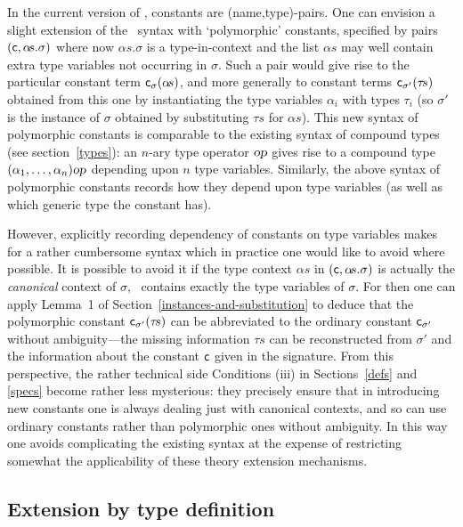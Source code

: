 In the current version of \HOL, constants are (name,type)-pairs.
One can envision a slight extension of the \HOL\ syntax with
`polymorphic' constants, specified by pairs
$({\sf c},\alpha\!s.\sigma)$ where now $\alpha\!s.\sigma$ is a
type-in-context and the list $\alpha\!s$ may well contain extra type
variables not occurring in $\sigma$. Such a pair would give rise
to the particular constant term
${\sf c}_\sigma(\alpha\!s)$, and more generally to
constant terms ${\sf c}_{\sigma'}(\tau\!s)$ obtained from
this one by instantiating the type variables $\alpha_i$ with types
$\tau_i$ (so $\sigma'$ is the instance of $\sigma$ obtained by
substituting $\tau\!s$ for $\alpha\!s$). This new syntax of polymorphic
constants is comparable to the existing syntax of compound types (see
section~\ref{types}): an $n$-ary type operator $\textsl{op}$ gives rise to a
compound type $(\alpha_1,\ldots,\alpha_n){\textsl{op}}$ depending upon $n$
type variables. Similarly, the above syntax of polymorphic constants
records how they depend upon type variables (as well as which generic
type the constant has).

However, explicitly recording dependency of constants on type variables
makes for a rather cumbersome syntax which in practice one would like
to avoid where possible. It is possible to avoid it if the type
context $\alpha\!s$ in $({\sf c},\alpha\!s.\sigma)$ is actually the
{\em canonical\/} context of $\sigma$, \ie\ contains exactly the type
variables of $\sigma$.  For then one can apply Lemma~1 of
Section~\ref{instances-and-substitution} to deduce that the
polymorphic constant ${\sf c}_{\sigma'}(\tau\!s)$ can be abbreviated
to the ordinary constant ${\sf c}_{\sigma'}$ without ambiguity---the
missing information $\tau\!s$ can be reconstructed from $\sigma'$ and
the information about the constant ${\sf c}$ given in the signature.
From this perspective, the rather technical side Conditions (iii) in
Sections~\ref{defs} and \ref{specs} become rather less mysterious:
they precisely ensure that in introducing new constants one is always
dealing just with canonical contexts, and so can use ordinary constants
rather than polymorphic ones without ambiguity. In this way one avoids
complicating the existing syntax at the expense of restricting
somewhat the applicability of these theory extension mechanisms.


\subsection{Extension by type definition}
\label{tydefs}

